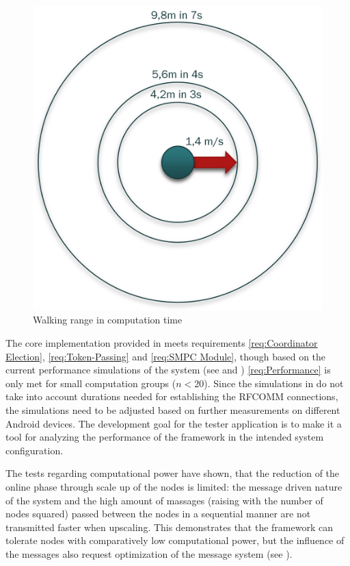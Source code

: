 \begin{figure}[!htbp] %
	\caption{Walking range in computation time} \label{figure:walking range in computation time}
	\includegraphics[scale=1.0]{figures/walking_range.png}
\end{figure}

The core implementation provided in  meets requirements \ref{req:Coordinator Election}, \ref{req:Token-Passing} and \ref{req:SMPC Module}, though based on the current performance simulations of the system (see  and ) \ref{req:Performance} is only met for small computation groups ($n<20$). Since the simulations in  do not take into account durations needed for establishing the \gls{RFCOMM} connections, the simulations need to be adjusted based on further measurements on different Android devices. The development goal for the tester application is to make it a tool for analyzing the performance of the framework in the intended system configuration.

The tests regarding computational power have shown, that the reduction of the online phase through scale up of the nodes is limited: the message driven nature of the system and the high amount of massages (raising with the number of nodes squared) passed between the nodes in a sequential manner are not transmitted faster when upscaling. This demonstrates that the framework can tolerate nodes with comparatively low computational power, but the influence of the messages also request optimization of the message system (see ).

